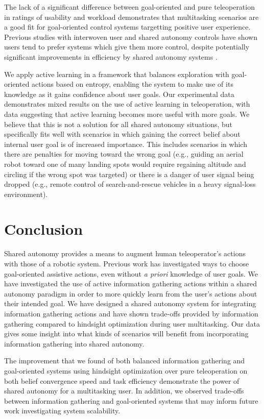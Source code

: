 \documentclass[conference]{IEEEtran}
\begin{document}
The lack of a significant difference between goal-oriented and pure teleoperation in ratings of usability and workload demonstrates that multitasking scenarios are a good fit for goal-oriented control systems targetting positive user experience. Previous studies with interwoven user and shared autonomy controls have shown users tend to prefer systems which give them more control, despite potentially significant improvements in efficiency by shared autonomy systems \cite{javdani2015shared, javdani2018shared}.

We apply active learning in a framework that balances exploration with goal-oriented actions based on entropy, enabling the system to make use of its knowledge as it gains confidence about user goals. Our experimental data demonstrates mixed results on the use of active learning in teleoperation, with data suggesting that active learning becomes more useful with more goals. We believe that this is not a solution for all shared autonomy situations, but specifically fits well with scenarios in which gaining the correct belief about internal user goal is of increased importance. This includes scenarios in which there are penalties for moving toward the wrong goal (e.g., guiding an aerial robot toward one of many landing spots would require regaining altitude and circling if the wrong spot was targeted) or there is a danger of user signal being dropped (e.g., remote control of search-and-rescue vehicles in a heavy signal-loss environment).

\section{Conclusion}

Shared autonomy provides a means to augment human teleoperator's actions with those of a robotic system. Previous work has investigated ways to choose goal-oriented assistive actions, even without \textit{a priori} knowledge of user goals. We have investigated the use of active information gathering actions within a shared autonomy paradigm in order to more quickly learn from the user's actions about their intended goal. We have designed a shared autonomy system for integrating information gathering actions and have shown trade-offs provided by information gathering compared to hindsight optimization during user multitasking. Our data gives some insight into what kinds of scenarios will benefit from incorporating information gathering into shared autonomy.

The improvement that we found of both balanced information gathering and goal-oriented systems using hindsight optimization over pure teleoperation on both belief convergence speed and task efficiency demonstrate the power of shared autonomy for a multitasking user. In addition, we observed trade-offs between information gathering and goal-oriented systems that may inform future work investigating system scalability.



\end{document}
